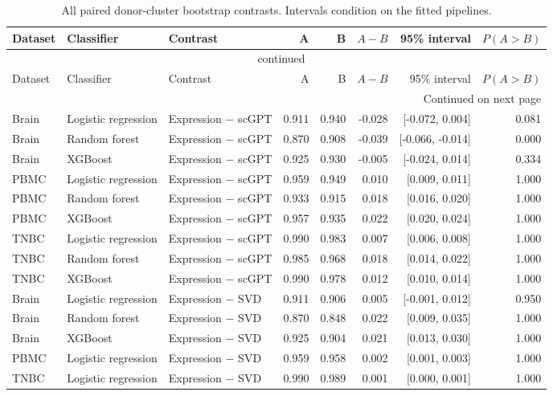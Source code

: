 {\footnotesize\setlength{\tabcolsep}{3pt}
\begin{longtable}{lllrrrrr}
\caption{All paired donor-cluster bootstrap contrasts. Intervals condition on the fitted pipelines.}\label{tab:s-bootstrap}\\
\toprule
Dataset & Classifier & Contrast & A & B & $A-B$ & 95\% interval & $P(A>B)$ \\
\midrule
\endfirsthead
\multicolumn{8}{c}{\tablename\ \thetable{} continued}\\
\toprule
Dataset & Classifier & Contrast & A & B & $A-B$ & 95\% interval & $P(A>B)$ \\
\midrule
\endhead
\midrule
\multicolumn{8}{r}{Continued on next page}\\
\endfoot
\bottomrule
\endlastfoot
Brain & Logistic regression & Expression $-$ scGPT & 0.911 & 0.940 & -0.028 & [-0.072, 0.004] & 0.081 \\
Brain & Random forest & Expression $-$ scGPT & 0.870 & 0.908 & -0.039 & [-0.066, -0.014] & 0.000 \\
Brain & XGBoost & Expression $-$ scGPT & 0.925 & 0.930 & -0.005 & [-0.024, 0.014] & 0.334 \\
PBMC & Logistic regression & Expression $-$ scGPT & 0.959 & 0.949 & 0.010 & [0.009, 0.011] & 1.000 \\
PBMC & Random forest & Expression $-$ scGPT & 0.933 & 0.915 & 0.018 & [0.016, 0.020] & 1.000 \\
PBMC & XGBoost & Expression $-$ scGPT & 0.957 & 0.935 & 0.022 & [0.020, 0.024] & 1.000 \\
TNBC & Logistic regression & Expression $-$ scGPT & 0.990 & 0.983 & 0.007 & [0.006, 0.008] & 1.000 \\
TNBC & Random forest & Expression $-$ scGPT & 0.985 & 0.968 & 0.018 & [0.014, 0.022] & 1.000 \\
TNBC & XGBoost & Expression $-$ scGPT & 0.990 & 0.978 & 0.012 & [0.010, 0.014] & 1.000 \\
Brain & Logistic regression & Expression $-$ SVD & 0.911 & 0.906 & 0.005 & [-0.001, 0.012] & 0.950 \\
Brain & Random forest & Expression $-$ SVD & 0.870 & 0.848 & 0.022 & [0.009, 0.035] & 1.000 \\
Brain & XGBoost & Expression $-$ SVD & 0.925 & 0.904 & 0.021 & [0.013, 0.030] & 1.000 \\
PBMC & Logistic regression & Expression $-$ SVD & 0.959 & 0.958 & 0.002 & [0.001, 0.003] & 1.000 \\
TNBC & Logistic regression & Expression $-$ SVD & 0.990 & 0.989 & 0.001 & [0.000, 0.001] & 1.000 \\

\end{longtable}}
